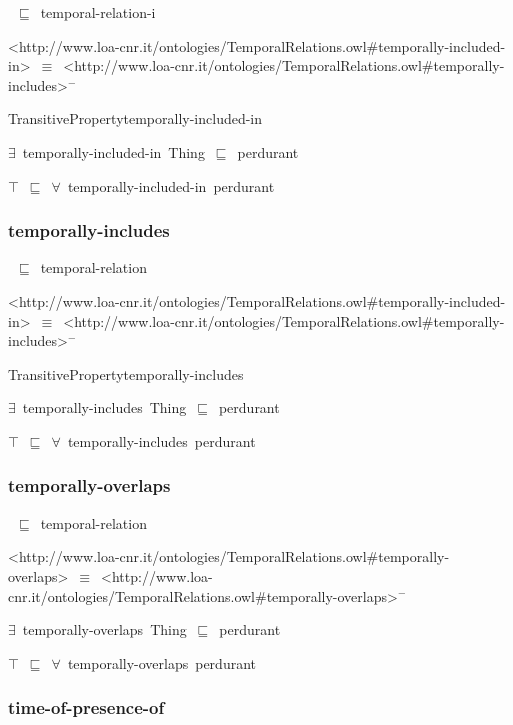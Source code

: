 \documentclass{article}
\begin{document}
~\ensuremath{\sqsubseteq}~temporal-relation-i

<http://www.loa-cnr.it/ontologies/TemporalRelations.owl#temporally-included-in>~\ensuremath{\equiv}~<http://www.loa-cnr.it/ontologies/TemporalRelations.owl#temporally-includes>\ensuremath{^-}

TransitivePropertytemporally-included-in

\ensuremath{\exists}~temporally-included-in~Thing~\ensuremath{\sqsubseteq}~perdurant

\ensuremath{\top}~\ensuremath{\sqsubseteq}~\ensuremath{\forall}~temporally-included-in~perdurant

\subsubsection*{temporally-includes}

~\ensuremath{\sqsubseteq}~temporal-relation

<http://www.loa-cnr.it/ontologies/TemporalRelations.owl#temporally-included-in>~\ensuremath{\equiv}~<http://www.loa-cnr.it/ontologies/TemporalRelations.owl#temporally-includes>\ensuremath{^-}

TransitivePropertytemporally-includes

\ensuremath{\exists}~temporally-includes~Thing~\ensuremath{\sqsubseteq}~perdurant

\ensuremath{\top}~\ensuremath{\sqsubseteq}~\ensuremath{\forall}~temporally-includes~perdurant

\subsubsection*{temporally-overlaps}

~\ensuremath{\sqsubseteq}~temporal-relation

<http://www.loa-cnr.it/ontologies/TemporalRelations.owl#temporally-overlaps>~\ensuremath{\equiv}~<http://www.loa-cnr.it/ontologies/TemporalRelations.owl#temporally-overlaps>\ensuremath{^-}

\ensuremath{\exists}~temporally-overlaps~Thing~\ensuremath{\sqsubseteq}~perdurant

\ensuremath{\top}~\ensuremath{\sqsubseteq}~\ensuremath{\forall}~temporally-overlaps~perdurant

\subsubsection*{time-of-presence-of}
\end{document}
